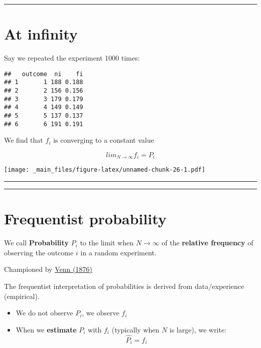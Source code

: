 \documentclass[
]{book}
\providecommand{\tightlist}{%
  \setlength{\itemsep}{0pt}\setlength{\parskip}{0pt}}
\begin{document}
\begin{center}\rule{0.5\linewidth}{0.5pt}\end{center}

\hypertarget{at-infinity}{%
\section{At infinity}\label{at-infinity}}

Say we repeated the experiment 1000 times:

\begin{verbatim}
##   outcome  ni    fi
## 1       1 188 0.188
## 2       2 156 0.156
## 3       3 179 0.179
## 4       4 149 0.149
## 5       5 137 0.137
## 6       6 191 0.191
\end{verbatim}

We find that \(f_i\) is converging to a constant value

\[lim_{N\rightarrow \infty} f_i = P_i\]

\texttt{[image: \_main\_files/figure-latex/unnamed-chunk-26-1.pdf]}

\begin{center}\rule{0.5\linewidth}{0.5pt}\end{center}

\begin{center}\rule{0.5\linewidth}{0.5pt}\end{center}

\hypertarget{frequentist-probability}{%
\section{Frequentist probability}\label{frequentist-probability}}

We call \textbf{Probability} \(P_i\) to the limit when \(N \rightarrow \infty\) of the \textbf{relative frequency} of observing the outcome \(i\) in a random experiment.

Championed by \href{https://plato.stanford.edu/entries/probability-interpret/\#ClaPro}{Venn (1876)}

The frequentist interpretation of probabilities is derived from data/experience (empirical).

\begin{itemize}
\tightlist
\item
  We do not observe \(P_i\), we observe \(f_i\)
\item
  When we \textbf{estimate} \(P_i\) with \(f_i\) (typically when \(N\) is large), we write: \[\hat{P_i}=f_i\]
\end{itemize}
\end{document}
